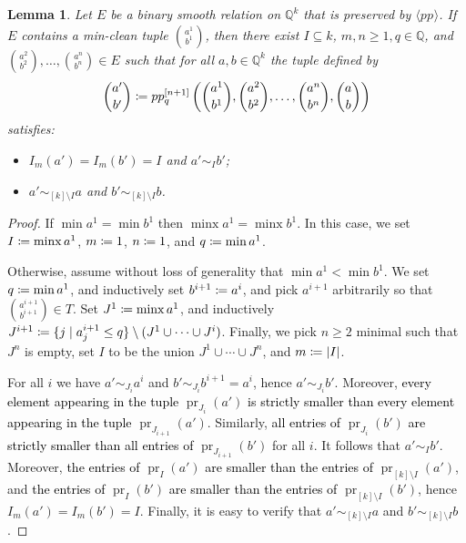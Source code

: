 \documentclass[a4paper,reqno, cleveref]{amsart}
\newcommand{\coloneqq}{\mathrel{\mathop:}\mathrel{\mkern-1.2mu}=}
\newtheorem{lemma}[theorem]{Lemma}
\newcommand{\Q}{\mathbb{Q}}
\newcommand{\br}[1]{[#1]}
\DeclareMathOperator{\pr}{pr}
\DeclareMathOperator{\minx}{minx}
\newcommand{\bin}{E}
\newcommand{\pp}[1]{pp_{#1}}
\newcommand{\nested}[2]{{#1^{[#2]}}}
\newcommand{\gen}[1]{\langle#1\rangle}
\newcommand\jo[1]{\textcolor{black}{#1}} %
\begin{document}
\begin{lemma}\label{cl:pp:slice} Let $\bin$ be a binary smooth relation on $\Q^k$ that is preserved by $\gen{\pp{}}$. If   $\bin$ contains a min-clean tuple  $\binom{a^1}{b^1}$, then there exist $I\subseteq k$, $m,n\geq1,  q\in \Q$, and $\binom{a^2}{b^2},\ldots,\binom{a^n}{b^n}\in \bin$ such that for all $a, b \in \Q^k$ the tuple  defined by  
  \begin{equation*}
      \binom{a'}{b'} \coloneqq\nested{\pp{q}}{n+1}\left(\binom{a^1}{b^1}, \binom{a^2}{b^2}, \dots, \binom{a^n}{b^n},\binom{a}{b}\right)
  \end{equation*}
  satisfies:
  \begin{itemize}
      \item $I_m(a')=I_m(b')=I$ and $a'\sim_I b'$;
      \item $a'\sim_{\br k\setminus I} a$ and $b'\sim_{\br k\setminus I} b$.
  \end{itemize}
\end{lemma}

\begin{proof}
    If $\min a^1=\min b^1$ then $\minx a^1=\minx b^1$. In this case, we set $I\coloneqq\minx a^1$, $m\coloneqq1$, $n\coloneqq1$, and $q\coloneqq\min a^1$.

    Otherwise, assume without loss of generality that $\min a^1<\min b^1$. We set $q\coloneqq\min a^1$, and inductively set $b^{i+1}\coloneqq a^i$, and pick $a^{i+1}$ arbitrarily so that $\binom{a^{i+1}}{b^{i+1}}\in T$. Set $J^1\coloneqq\minx a^1$, and inductively $J^{i+1}\coloneqq\{j\;|\; a^{i+1}_j\leq q\}\setminus \jo{(}J^1\cup\cdots\cup J^{i}\jo{)}$. Finally, we pick $n \geq 2$ minimal such that $J^n$ is empty, set $I$ to be the union $J^1\cup\cdots\cup J^n$, and $m\coloneqq|I|$.

    For all $i$ we have $a'\sim_{J_i} a^i$ and $b'\sim_{J_i} b^{i+1}=a^i$, hence $a'\sim_{J_i}b'$. Moreover, \jo{every element appearing in the tuple} $\pr_{J_i}(a')$ \jo{is strictly smaller than every element appearing in the tuple}  $\pr_{J_{i+1}}(a')$. %
    Similarly, \jo{all entries of} $\pr_{J_i}(b')$ \jo{are strictly smaller than all entries of} $\pr_{J_{i+1}}(b')$ for all $i$. It follows that  $a'\sim_I b'$. Moreover, \jo{the entries of} $\pr_I(a')$ \jo{are smaller than the entries of} $\pr_{\br k\setminus I}(a')$, and \jo{the entries of} $\pr_I(b')$ \jo{are smaller than the entries of} $\pr_{\br k\setminus I}(b')$, hence $I_m(a')=I_m(b')=I$. Finally, it is easy to verify that $a'\sim_{\br k\setminus I} a$ and $b'\sim_{\br k\setminus I} b$.
\end{proof}
\end{document}
